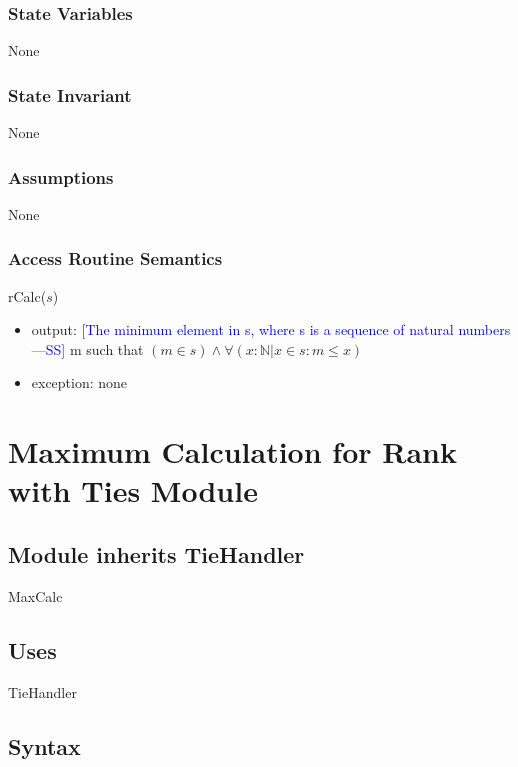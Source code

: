 \documentclass[12pt,fleqn]{examtst}
\newcommand{\authornote}[3]{\textcolor{#1}{[#3 ---#2]}}
\newcommand{\authornote}[3]{}
\newcommand{\wss}[1]{\authornote{blue}{SS}{#1}}
\begin{document}
\subsubsection* {State Variables}

None

\subsubsection* {State Invariant}

None

\subsubsection* {Assumptions}

None

\subsubsection* {Access Routine Semantics}

rCalc($s$)
\begin{itemize}
\item output: \wss{The minimum element in s, where s is a sequence of natural
    numbers} m such that $(m \in s) \wedge \forall (x: \mathbb{N} | x \in s: m \le x)$
\item exception: none
\end{itemize}


\newpage

\section* {Maximum Calculation for Rank with Ties Module}

\subsection*{Module inherits TieHandler}

MaxCalc

\subsection* {Uses}

TieHandler

\subsection* {Syntax}
\end{document}
